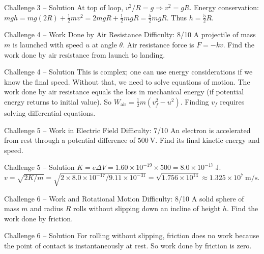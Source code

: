 \documentclass[11pt]{beamer}
\begin{document}
\begin{frame}{Challenge 3 – Solution}
At top of loop, $v^2/R = g \Rightarrow v^2 = gR$.
Energy conservation: $mgh = mg(2R) + \frac12 m v^2 = 2mgR + \frac12 mgR = \frac52 mgR$.
Thus $h = \frac52 R$.
\end{frame}

\begin{frame}[shrink=15]{Challenge 4 – Work Done by Air Resistance \hfill Difficulty: 8/10}
A projectile of mass $m$ is launched with speed $u$ at angle $\theta$. Air resistance force is $F = -k v$. Find the work done by air resistance from launch to landing.
\end{frame}

\begin{frame}{Challenge 4 – Solution}
This is complex; one can use energy considerations if we know the final speed. Without that, we need to solve equations of motion. The work done by air resistance equals the loss in mechanical energy (if potential energy returns to initial value). So $W_{\text{air}} = \frac12 m(v_f^2 - u^2)$. Finding $v_f$ requires solving differential equations.
\end{frame}

\begin{frame}[shrink=15]{Challenge 5 – Work in Electric Field \hfill Difficulty: 7/10}
An electron is accelerated from rest through a potential difference of $500\ \mathrm{V}$. Find its final kinetic energy and speed.
\end{frame}

\begin{frame}{Challenge 5 – Solution}
$K = e\Delta V = 1.60\times10^{-19}\times500 = 8.0\times10^{-17}\ \mathrm{J}$.
$v = \sqrt{2K/m} = \sqrt{2\times8.0\times10^{-17} / 9.11\times10^{-31}} = \sqrt{1.756\times10^{14}} \approx 1.325\times10^7\ \mathrm{m/s}$.
\end{frame}

\begin{frame}[shrink=15]{Challenge 6 – Work and Rotational Motion \hfill Difficulty: 8/10}
A solid sphere of mass $m$ and radius $R$ rolls without slipping down an incline of height $h$. Find the work done by friction.
\end{frame}

\begin{frame}{Challenge 6 – Solution}
For rolling without slipping, friction does no work because the point of contact is instantaneously at rest. So work done by friction is zero.
\end{frame}
\end{document}
